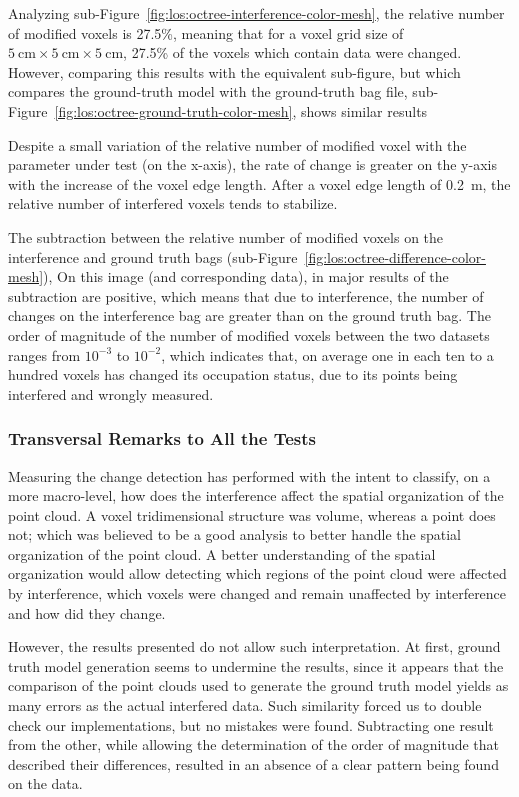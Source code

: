 Analyzing sub-Figure~\ref{fig:los:octree-interference-color-mesh}, the relative number of modified voxels is 27.5\%, meaning that for a voxel grid size of $\SI{5}{\centi\meter}\times \SI{5}{\centi\meter}\times \SI{5}{\centi\meter}$, 27.5\% of the voxels which contain data were changed. However, comparing this results with the equivalent sub-figure, but which compares the ground-truth model with the ground-truth bag file, sub-Figure~\ref{fig:los:octree-ground-truth-color-mesh}, shows similar results

Despite a small variation of the relative number of modified voxel with the parameter under test (on the x-axis), the rate of change is greater on the y-axis with the increase of the voxel edge length. After a voxel edge length of \SI{0.2}{\meter}, the relative number of interfered voxels tends to stabilize. 

The subtraction between the relative number of modified voxels on the interference and ground truth bags (sub-Figure~\ref{fig:los:octree-difference-color-mesh}), On this image (and corresponding data), in major results of the subtraction are positive, which means that due to interference, the number of changes on the interference bag are greater than on the ground truth bag. The order of magnitude of the number of modified voxels between the two datasets ranges from $10^{-3}$ to $10^{-2}$, which indicates that, on average one in each ten to a hundred voxels has changed its occupation status, due to its points being interfered and wrongly measured.


\subsubsection{Transversal Remarks to All the Tests}
Measuring the change detection has performed with the intent to classify, on a more macro-level, how does the interference affect the spatial organization of the point cloud. A voxel tridimensional structure was volume, whereas a point does not; which was believed to be a good analysis to better handle the spatial organization of the point cloud. A better understanding of the spatial organization would allow detecting which regions of the point cloud were affected by interference, which voxels were changed and remain unaffected by interference and how did they change.

However, the results presented do not allow such interpretation. At first, ground truth model generation seems to undermine the results, since it appears that the comparison of the point clouds used to generate the ground truth model yields as many errors as the actual interfered data. Such similarity forced us to double check our implementations, but no mistakes were found. Subtracting one result from the other, while allowing the determination of the order of magnitude that described their differences, resulted in an absence of a clear pattern being found on the data.

